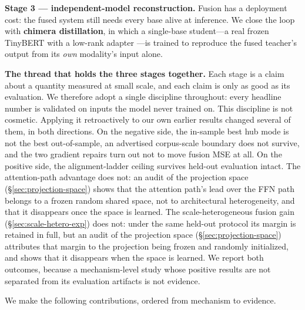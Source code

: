 \documentclass[10pt,twoside]{article}
\theoremstyle{definition}
\theoremstyle{plain}
\theoremstyle{remark}
\begin{document}
\textbf{Stage 3 --- independent-model reconstruction.} Fusion has a deployment cost: the fused system still needs every base alive at inference. We close the loop with \textbf{chimera distillation}, in which a single-base student---a real frozen TinyBERT \citep{jiao2020} with a low-rank adapter \citep{hu2022}---is trained to reproduce the fused teacher's output from its \emph{own} modality's input alone.

\textbf{The thread that holds the three stages together.} Each stage is a claim about a quantity measured at small scale, and each claim is only as good as its evaluation. We therefore adopt a single discipline throughout: every headline number is validated on inputs the model never trained on. This discipline is not cosmetic. Applying it retroactively to our own earlier results changed several of them, in both directions. On the negative side, the in-sample best hub mode is not the best out-of-sample, an advertised corpus-scale boundary does not survive, and the two gradient repairs turn out not to move fusion MSE at all. On the positive side, the alignment-ladder ceiling survives held-out evaluation intact. The attention-path advantage does not: an audit of the projection space (\S\ref{sec:projection-space}) shows that the attention path's lead over the FFN path belongs to a frozen random shared space, not to architectural heterogeneity, and that it disappears once the space is learned. The scale-heterogeneous fusion gain (\S\ref{sec:scale-hetero-exp}) does not: under the same held-out protocol its margin is retained in full, but an audit of the projection space (\S\ref{sec:projection-space}) attributes that margin to the projection being frozen and randomly initialized, and shows that it disappears when the space is learned. We report both outcomes, because a mechanism-level study whose positive results are not separated from its evaluation artifacts is not evidence.

We make the following contributions, ordered from mechanism to evidence.
\end{document}
